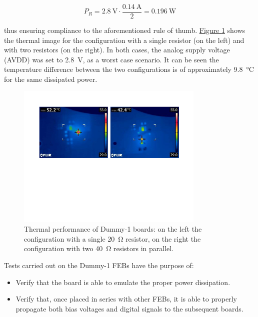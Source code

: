 \begin{equation}
    P_{R} = \SI{2.8}{\volt} \cdot \frac{\SI{0.14}{\ampere}}{2} = \SI{0.196}{\watt}
\end{equation}

\noindent
thus ensuring compliance to the aforementioned rule of thumb. \hyperref[figDummyThermal]{Figure \ref{figDummyThermal}} shows the thermal image for the configuration with a single resistor (on the left) and with two resistors (on the right). In both cases, the analog supply voltage (AVDD) was set to \SI{2.8}{\volt}, as a worst case scenario. It can be seen the temperature difference between the two configurations is of approximately \SI{9.8}{\celsius} for the same dissipated power.

\begin{figure}[h!]
    \centering
    \includegraphics[width=0.8\textwidth]{Images/chap2/DUMMY_bef_aft.pdf}
    \caption{Thermal performance of Dummy-1 boards: on the left the configuration with a single \SI{20}{\ohm} resistor, on the right the configuration with two \SI{40}{\ohm} resistors in parallel.}
    \label{figDummyThermal}
\end{figure}

\par
\noindent
Tests carried out on the Dummy-1 FEBs have the purpose of:

\begin{itemize}
    \itemsep0em 
    \item Verify that the board is able to emulate the proper power dissipation.
    \item Verify that, once placed in series with other FEBs, it is able to properly propagate both bias voltages and digital signals to the subsequent boards.
\end{itemize}


